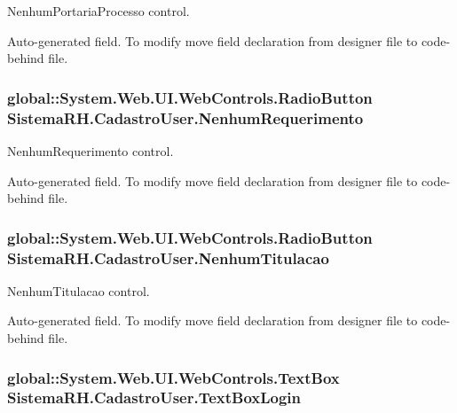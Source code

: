 NenhumPortariaProcesso control. 

Auto-\/generated field. To modify move field declaration from designer file to code-\/behind file. \hypertarget{class_sistema_r_h_1_1_cadastro_user_a0b816cc331505340b5471c43a6056ae6}{
\subsubsection[{NenhumRequerimento}]{\setlength{\rightskip}{0pt plus 5cm}global::System.Web.UI.WebControls.RadioButton {\bf SistemaRH.CadastroUser.NenhumRequerimento}}}
\label{class_sistema_r_h_1_1_cadastro_user_a0b816cc331505340b5471c43a6056ae6}


NenhumRequerimento control. 

Auto-\/generated field. To modify move field declaration from designer file to code-\/behind file. \hypertarget{class_sistema_r_h_1_1_cadastro_user_afe9c666ae3a9054f5816e78228440256}{
\subsubsection[{NenhumTitulacao}]{\setlength{\rightskip}{0pt plus 5cm}global::System.Web.UI.WebControls.RadioButton {\bf SistemaRH.CadastroUser.NenhumTitulacao}}}
\label{class_sistema_r_h_1_1_cadastro_user_afe9c666ae3a9054f5816e78228440256}


NenhumTitulacao control. 

Auto-\/generated field. To modify move field declaration from designer file to code-\/behind file. \hypertarget{class_sistema_r_h_1_1_cadastro_user_a8379e624d20a34d9c20a2d3f4d1682f9}{
\subsubsection[{TextBoxLogin}]{\setlength{\rightskip}{0pt plus 5cm}global::System.Web.UI.WebControls.TextBox {\bf SistemaRH.CadastroUser.TextBoxLogin}}}
\label{class_sistema_r_h_1_1_cadastro_user_a8379e624d20a34d9c20a2d3f4d1682f9}


